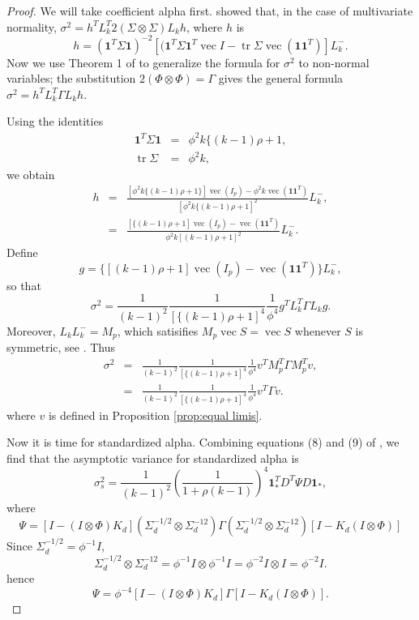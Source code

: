 \documentclass[twoside]{article}
\DeclareMathOperator{\tr}{tr}
\DeclareMathOperator{\vvec}{vec}
\begin{document}
\begin{proof}
We will take coefficient alpha first. \citet{Van_Zyl2000-si} showed that, in the case
of multivariate normality, $\sigma^{2}=h^{T}L_{k}^{T}2(\Sigma\otimes\Sigma)L_{k}h$,
where $h$ is \citep[eq. 19]{Van_Zyl2000-si}
\begin{equation*}
h = (\boldsymbol{1}^{T}\Sigma\boldsymbol{1})^{-2}[(\boldsymbol{1}^{T}\Sigma\boldsymbol{1}^{T}\vvec I-\tr\Sigma\vvec(\boldsymbol{1}\boldsymbol{1}^{T})]L_{k}^{-}.
\end{equation*}
Now we use Theorem 1 of \citet{Neudecker1990-ph} to generalize the formula for $\sigma^2$ to non-normal variables; the substitution
$2(\Phi\otimes\Phi)=\Gamma$ gives the general formula $\sigma^{2}=h^{T}L_{k}^{T}\Gamma L_{k}h.$

Using the identities
\begin{eqnarray*}
\boldsymbol{1}^{T}\Sigma\boldsymbol{1} & = & \phi^{2}k\{(k-1)\rho+1,\\
\tr\Sigma & = & \phi^{2}k,
\end{eqnarray*}
we obtain
\begin{eqnarray*}
h & = & \frac{[\phi^{2}k\{(k-1)\rho+1\}]\vvec(I_{p})-\phi^{2}k\vvec(\boldsymbol{1}\boldsymbol{1}^{T})}{[\phi^{2}k\{(k-1)\rho+1]^{2}}L_{k}^{-},\\
 & = & \frac{[\{(k-1)\rho+1]\vvec(I_{p})-\vvec(\boldsymbol{1}\boldsymbol{1}^{T})}{\phi^{2}k[(k-1)\rho+1]^{2}}L_{k}^{-}.
\end{eqnarray*}
Define
\[
g=\{[(k-1)\rho+1]\vvec(I_{p})-\vvec(\boldsymbol{1}\boldsymbol{1}^{T})\}L_{k}^{-},
\]
so that
\[
\sigma^{2}=\frac{1}{(k-1)^{2}}\frac{1}{[\{(k-1)\rho+1]^{4}}\frac{1}{\phi^{4}}g^{T}L_{k}^{T}\Gamma L_{k}g.
\]
Moreover, $L_{k}L_{k}^{-}=M_{p}$, which satisifies $M_{p}\vvec S=\vvec S$
whenever $S$ is symmetric, see \citet[p. 275]{Van_Zyl2000-si}. Thus 
\begin{eqnarray*}
\sigma^{2} & = & \frac{1}{(k-1)^{2}}\frac{1}{[\{(k-1)\rho+1]^{4}}\frac{1}{\phi^{4}}v^{T}M_{p}^{T}\Gamma M_{p}^{T}v,\\
 & = & \frac{1}{(k-1)^{2}}\frac{1}{[\{(k-1)\rho+1]^{4}}\frac{1}{\phi^{4}}v^{T}\Gamma v.
\end{eqnarray*} where $v$ is defined in Proposition \ref{prop:equal limis}.

Now it is time for standardized alpha. Combining equations (8) and (9) of \citet{hayashi2005note},
we find that the asymptotic variance for standardized alpha is
\begin{equation*}
\sigma_{s}^{2}=\frac{1}{(k-1)^{2}}\left(\frac{1}{1+\rho(k-1)}\right)^{4}\boldsymbol{1}_{*}^{T}D^{T}\Psi D\boldsymbol{1}_{*},\label{eq:standardized alpha variance 3}
\end{equation*}
where 
\[
\Psi=[I-(I\otimes\Phi)K_{d}](\Sigma_{d}^{-1/2}\otimes\Sigma_{d}^{-12})\Gamma(\Sigma_{d}^{-1/2}\otimes\Sigma_{d}^{-12})[I-K_{d}(I\otimes\Phi)]
\]
Since $\Sigma_{d}^{-1/2}=\phi^{-1}I$,
\[
\Sigma_{d}^{-1/2}\otimes\Sigma_{d}^{-12}=\phi^{-1}I\otimes\phi^{-1}I=\phi^{-2}I\otimes I=\phi^{-2}I.
\]
hence 
\[
\Psi=\phi^{-4}[I-(I\otimes\Phi)K_{d}]\Gamma[I-K_{d}(I\otimes\Phi)].
\]
\end{proof}
\end{document}
